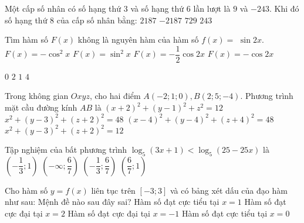 \begin{ex}%
Một cấp số nhân có số hạng thứ $3$ và số hạng thứ $6$ lần lượt là $9$ và $-243$. Khi đó số hạng thứ $8$ của cấp số nhân bằng:
\choice
{$2187$}
{\True $-2187$}
{$729$}
{$243$}

\end{ex}
\begin{ex}%
Tìm hàm số $F(x)$ không là nguyên hàm của hàm số $f(x)=$ $\sin 2 x$.
\choice
{$F(x)=-\cos ^2 x$}
{$F(x)=\sin ^2 x$}
{$F(x)=-\dfrac{1}{2} \cos 2 x$}
{\True $F(x)=-\cos 2 x$}

\end{ex}
\begin{ex}%
{\vspace{-0.5cm}
}
\choice
{$0$}
{\True $2$}
{$1$}
{$4$}
\end{ex}
\begin{ex}%
Trong không gian $O x y z$, cho hai điểm $A(-2; 1; 0), B(2; 5;-4)$.
Phương trình mặt cầu đường kính $AB$ là
\choice
{$(x+2)^2+(y-1)^2+z^2=12$}
{$x^2+(y-3)^2+(z+2)^2=48$}
{$(x-4)^2+(y-4)^2+(z+4)^2=48$}
{\True $x^2+(y-3)^2+(z+2)^2=12$}

\end{ex}
\begin{ex}%
Tập nghiệm của bất phương trình $\log_5(3 x+1)<\log_5(25-25 x)$ là
\choice
{$\left(-\dfrac{1}{3}; 1\right)$}
{$\left(-\infty; \dfrac{6}{7}\right)$}
{\True $\left(-\dfrac{1}{3}; \dfrac{6}{7}\right)$}
{$\left(\dfrac{6}{7}; 1\right)$}

\end{ex}
\begin{ex}%
Cho hàm số $y=f(x)$ liên tục trên $[-3; 3]$ và có bảng xét dấu của đạo hàm như sau:
Mệnh đề nào sau đây sai?
\choice
{Hàm số đạt cực tiểu tại $x=1$}
{Hàm số đạt cực đại tại $x=2$}
{Hàm số đạt cực đại tại $x=-1$}
{\True Hàm số đạt cực tiểu tại $x=0$}

\end{ex}


